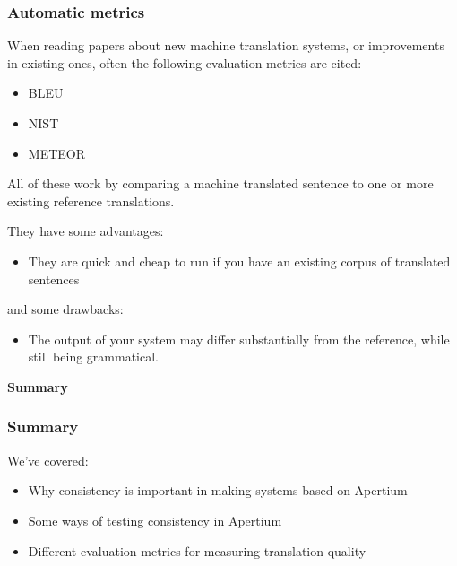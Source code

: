 \documentclass[10pt,xetex]{beamer} %
\begin{document}
\begin{frame}
  \frametitle{Automatic metrics}

When reading papers about new machine translation systems, or improvements 
in existing ones, often the following evaluation metrics are cited:

\begin{itemize}
  \item BLEU
  \item NIST
  \item METEOR
\end{itemize}

All of these work by comparing a machine translated sentence to one or more 
existing reference translations.

They have some advantages:

\begin{itemize}
  \item They are quick and cheap to run if you have an existing corpus
     of translated sentences
\end{itemize}

and some drawbacks:

\begin{itemize}
  \item The output of your system may differ substantially from the 
    reference, while still being grammatical.
\end{itemize}

\end{frame}
%
%
%
%
%
%
%
%

%
%
%
\begin{frame} %
 \begin{center}
 {\Large {\bf Summary}} %
 \end{center}
\end{frame}



\begin{frame}
  \frametitle{Summary}

We've covered:

\begin{itemize}
  \item Why consistency is important in making systems based on Apertium

  \item Some ways of testing consistency in Apertium

  \item Different evaluation metrics for measuring translation quality
\end{itemize}

\end{frame}
\end{document}
